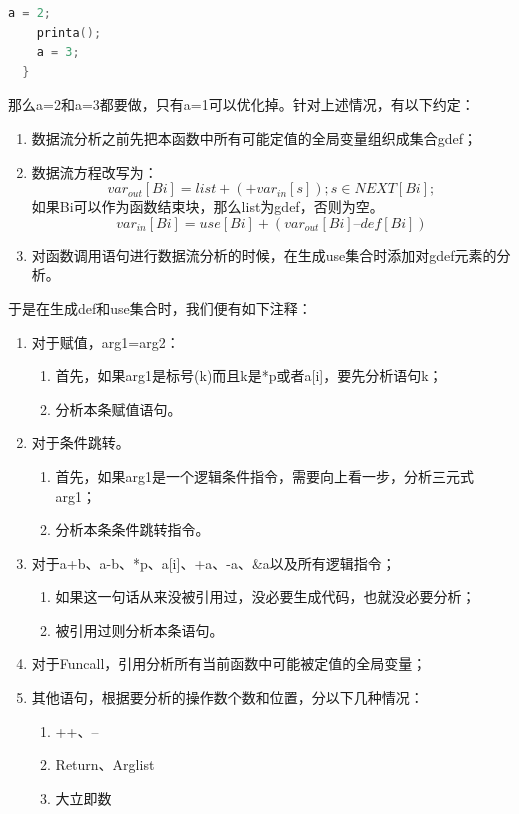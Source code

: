 \documentclass[12pt,a4paper,Flow]{report}
\begin{document}
\begin{enumerate}
\begin{lstlisting}[language=c]
    a = 2;
    printa();
    a = 3;
  }
\end{lstlisting}
那么a=2和a=3都要做，只有a=1可以优化掉。针对上述情况，有以下约定：
\begin{enumerate}
\item 数据流分析之前先把本函数中所有可能定值的全局变量组织成集合gdef；
\item 数据流方程改写为：
\begin{displaymath}
	var_{out}[Bi] = list+(+var_{in}[s]);s\in NEXT[Bi];
\end{displaymath}
如果Bi可以作为函数结束块，那么list为gdef，否则为空。
\begin{displaymath}
	var_{in}[Bi] = use[Bi] + (var_{out}[Bi] – def[Bi])
\end{displaymath}
\item 对函数调用语句进行数据流分析的时候，在生成use集合时添加对gdef元素的分析。
\end{enumerate}
\end{enumerate}
于是在生成def和use集合时，我们便有如下注释：
\begin{enumerate}
\item 对于赋值，arg1=arg2：
\begin{enumerate}
\item 首先，如果arg1是标号(k)而且k是*p或者a[i]，要先分析语句k；
\item 分析本条赋值语句。
\end{enumerate}
\item 对于条件跳转。
\begin{enumerate}
\item 首先，如果arg1是一个逻辑条件指令，需要向上看一步，分析三元式arg1；
\item 分析本条条件跳转指令。
\end{enumerate}
\item 对于a+b、a-b、*p、a[i]、+a、-a、\&a以及所有逻辑指令；
\begin{enumerate}
\item 如果这一句话从来没被引用过，没必要生成代码，也就没必要分析；
\item 被引用过则分析本条语句。
\end{enumerate}
\item 对于Funcall，引用分析所有当前函数中可能被定值的全局变量；
\item 其他语句，根据要分析的操作数个数和位置，分以下几种情况：
\begin{enumerate}
\item ++、--
\item Return、Arglist
\item 大立即数
\end{enumerate}
\end{enumerate}
\end{document}

